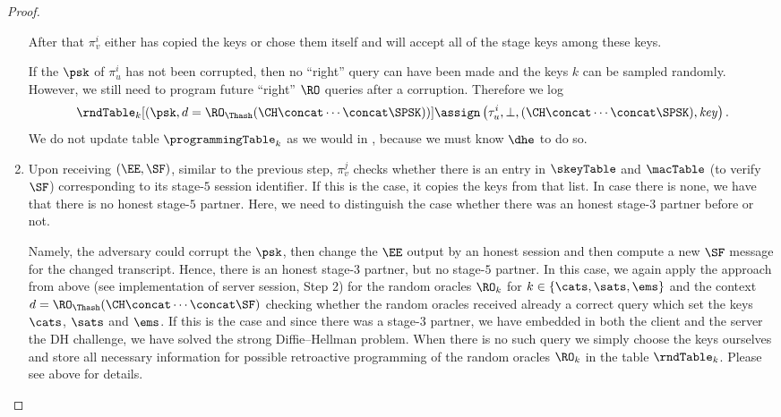 \begin{proof}
\begin{enumerate}
		After that $\pi_v^i$ either has copied the keys or chose them itself and will accept all of the stage keys among these keys.
		
		If the $\psk$ of $\pi_u^i$ has not been corrupted, then no ``right'' query can have been made and the keys $k$ can be sampled randomly. 
		However, we still need to program future ``right'' $\RO$ queries after a corruption.
		Therefore we log
		\[
		\rndTable_k[(\psk, d = \RO_\Thash(\CH \concat \dotsb \concat \SPSK) )] \assign \left(  \tau_u^i, \bot, (\CH \concat \dotsb \concat \SPSK), \mathit{key} \right).
		\]
		We do not update table $\programmingTable_{k}$ as we would in \thisGame, because we must know $\dhe$ to do so.
%		
		\item 	Upon receiving $(\EE, \SF)$, similar to the previous step, $\pi_v^j$ checks whether there is an entry in $\skeyTable$ and $\macTable$ (to verify $\SF$) corresponding to its stage-$5$ session identifier.
		If this is the case, it copies the keys from that list.
		In case there is none, we have that there is no honest stage-$5$ partner.
		Here, we need to distinguish the case whether there was an honest stage-$3$ partner before or not.
		
		Namely, the adversary could corrupt the $\psk$, then change the $\EE$ output by an honest session and then compute a new $\SF$ message for the changed transcript.
		Hence, there is an honest stage-$3$ partner, but no stage-$5$ partner.
		In this case, we again apply the approach from above (see implementation of server session, Step 2) for the random oracles $\RO_{k}$ for $k \in \{\cats, \sats, \ems\}$ and the context $d = \RO_\Thash(\CH \concat \dotsb \concat \SF)$ checking whether the random oracles received already a correct query which set the keys $\cats$, $\sats$ and $\ems$.
		If this is the case and since there was a stage-$3$ partner, we have embedded in both the client and the server the DH challenge, we have solved the strong Diffie--Hellman problem.
		When there is no such query we simply choose the keys ourselves and store all necessary information for possible retroactive programming of the random oracles $\RO_{k}$ in the table $\rndTable_{k}$.
		Please see above for details.
		

\end{enumerate}
\end{proof}
